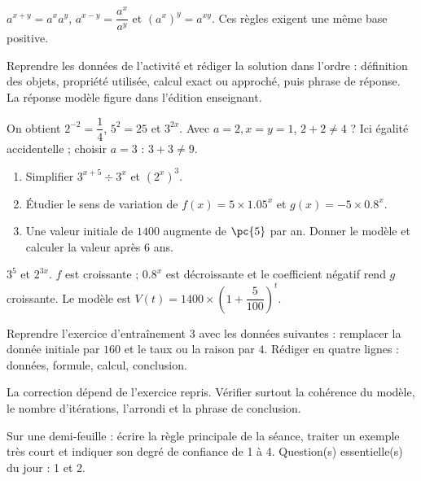 \begin{summary}$a^{x+y}=a^xa^y$, $a^{x-y}=\dfrac{a^x}{a^y}$ et $(a^x)^y=a^{xy}$. Ces règles exigent une même base positive.\end{summary}

\begin{example}
Reprendre les données de l'activité et rédiger la solution dans l'ordre : définition des objets, propriété utilisée, calcul exact ou approché, puis phrase de réponse. La réponse modèle figure dans l'édition enseignant.
\end{example}
\begin{solution}On obtient $2^{-2}=\dfrac14$, $5^2=25$ et $3^{2x}$. Avec $a=2,x=y=1$, $2+2\neq4$ ? Ici égalité accidentelle ; choisir $a=3$ : $3+3\neq9$.\end{solution}

\begin{exercise}[essentiel]
\begin{enumerate}\item Simplifier $3^{x+5}\div3^x$ et $(2^x)^3$.\item Étudier le sens de variation de $f(x)=5\times\num{1,05}^x$ et $g(x)=-5\times\num{0,8}^x$.\item Une valeur initiale de $1400$ augmente de $\pc{5}$ par an. Donner le modèle et calculer la valeur après $6$ ans.\end{enumerate}
\end{exercise}
\begin{solution}$3^5$ et $2^{3x}$. $f$ est croissante ; $\num{0,8}^x$ est décroissante et le coefficient négatif rend $g$ croissante. Le modèle est $V(t)=1400\times\left(1+\dfrac{5}{100}\right)^t$.\end{solution}


\begin{homework}Reprendre l'exercice d'entraînement 3 avec les données suivantes : remplacer la donnée initiale par $160$ et le taux ou la raison par $4$. Rédiger en quatre lignes : données, formule, calcul, conclusion.\end{homework}
\begin{solution}La correction dépend de l'exercice repris. Vérifier surtout la cohérence du modèle, le nombre d'itérations, l'arrondi et la phrase de conclusion.\end{solution}

\begin{exitticket}[3 minutes]Sur une demi-feuille : écrire la règle principale de la séance, traiter un exemple très court et indiquer son degré de confiance de 1 à 4. Question(s) essentielle(s) du jour : 1 et 2.\end{exitticket}

